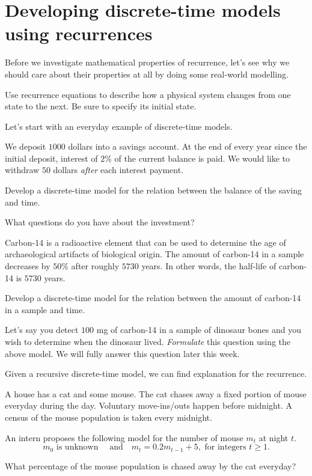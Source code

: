 \documentclass[../main.tex]{subfiles}
\begin{document}
 \section{Developing discrete-time models using recurrences}

Before we investigate mathematical properties of recurrence, let's see why we should care about their properties at all by doing some real-world modelling. 

\begin{method}
  Use recurrence equations to describe how a physical system changes from one state to the next.  Be sure to specify its initial state.
\end{method}


Let's start with an everyday example of discrete-time models.
\begin{example} \label{ex:recurrsion-investment-model}
  We deposit \(1000\) dollars into a savings account. At the end of every year since the initial deposit, interest of \(2\%\) of the current balance is paid. We would like to withdraw \(50\) dollars \emph{after} each interest payment.

  Develop a discrete-time model for the relation between the balance of the saving and time.

\end{example}

\faComment{} What questions do you have about the investment?

\begin{example} \label{ex:recurrsion-half-life}
  Carbon-14 is a radioactive element that can be used to determine the age of archaeological artifacts of biological origin.  The amount of carbon-14 in a sample decreases by \(50\%\) after roughly \(5730\) years. In other words, the half-life of carbon-14 is \(5730\) years. 

  Develop a discrete-time model for the relation between the amount of carbon-14 in a sample and time.

  \faComment{} Let's say you detect \(100\) mg of carbon-14 in a sample of dinosaur bones and you wish to determine when the dinosaur lived. \emph{Formulate} this question using the above model. We will fully answer this question later this week.
\end{example}

Given a recursive discrete-time model, we can find explanation for the recurrence.
\begin{example}
  A house has a cat and some mouse.  The cat chases away a fixed portion of mouse everyday during the day. Voluntary move-ins/outs happen before midnight. 
  A census of the mouse population is taken every midnight.

  An intern proposes the following model for the number of mouse \(m_{t}\) at night \(t\).  
  \[
    m_{0} \text{ is unknown } \quad\text{and}\quad m_{t} = 0.2 m_{t-1} + 5, \text{ for integers } t \ge 1.
  \]

  What percentage of the mouse population is chased away by the cat everyday?
\end{example}
\end{document}

